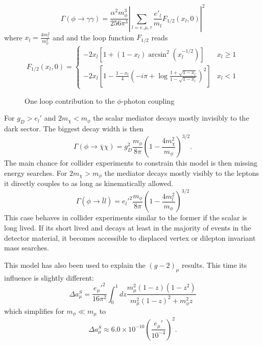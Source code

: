 \begin{equation}
\Gamma(\phi\rightarrow \gamma \gamma)= \frac{\alpha^2m_\phi^3}{256\pi^3}\left\lvert\sum_{l=e,\mu,\tau} \frac{e'_l}{m_l}F_{1/2}(x_l,0) \right\lvert^2
\end{equation}
where $x_l = \frac{4m_l^2}{m_\phi^2}$ and and the loop function $F_{1/2}$ reads
\begin{equation}
F_{1/2}(x_l,0)= \begin{cases}
-2x_l\left[1+(1-x_l)\arcsin^2(x_l^{-1/2})\right]&x_l \geq 1\\
-2x_l\left[1-\frac{1-x_l}{4}\left(-i\pi +\log\frac{1+\sqrt{1-x_l}}{1-\sqrt{1-x_l}}\right)^2\right]&x_l<1
\end{cases}
\end{equation}

\begin{figure}[H]
\centering
{}
\caption{One loop contribution to the $\phi$-photon coupling}
\label{fg:PhotonCoupling}
\end{figure}

For $g_D > e_l'$ and $2m_\chi < m_\phi$ the scalar mediator decays mostly invisibly to the dark sector.
The biggest decay width is then 
\begin{equation}
\Gamma(\phi \rightarrow \bar{\chi}\chi)=g_D^2\frac{m_\phi}{8\pi}\left(1-\frac{4m_\chi^2}{m_\phi}\right)^{3/2} .
\end{equation}
The main chance for collider experiments to constrain this model is then missing energy searches.
For $2m_\chi > m_\phi$ the mediator decays mostly visibly to the leptons it directly couples to as long as kinematically allowed.
\begin{equation}
\Gamma(\phi \rightarrow \bar{l}l)=e_l'^2\frac{m_\phi}{8\pi}\left(1-\frac{4m_l^2}{m_\phi}\right)^{3/2}
\end{equation}
This case behaves in collider experiments similar to the former if the scalar is long lived. If its short lived and decays at least in the majority of events in the detector material, it becomes accessible to displaced vertex or dilepton invariant mass searches.

This model has also been used to explain the $(g-2)_\mu$ results. This time its influence is slightly different:
\begin{equation}
\Delta a_\mu^S=\frac{e_\mu'^2}{16\pi^2}\int_0^1 d z \frac{m_\mu^2(1-z)(1-z^2)}{m_\mu^2(1-z)^2+m_{\phi}^2z}
\end{equation}
which simplifies for $m_{\phi}\ll m_\mu$ to
\begin{equation}
\Delta a_\mu^S \approx 6.0\times 10^{-10}\left(\frac{e_\mu'}{10^{-4}}\right)^2 .
\end{equation}